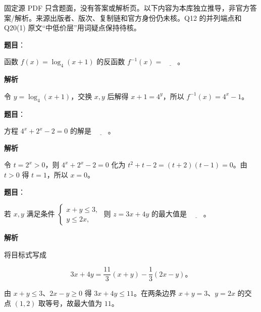 

\begin{gktip}
固定源 PDF 只含题面，没有答案或解析页。以下内容为本库独立推导，非官方答案/解析。来源出版者、版次、复制链和官方身份仍未核。Q12 的并列端点和 Q20(1) 原文“中低价层”用词疑点保持待核。
\end{gktip}

\begin{answer}

\textbf{题目}：

函数 $f(x)=\log_4(x+1)$ 的反函数 $f^{-1}(x)=\underline{\qquad}$。

\textbf{解析}

令 $y=\log_4(x+1)$，交换 $x,y$ 后解得 $x+1=4^y$，所以 $f^{-1}(x)=4^x-1$。


\end{answer}
\begin{answer}

\textbf{题目}：

方程 $4^x+2^x-2=0$ 的解是 $\underline{\qquad}$。

\textbf{解析}

令 $t=2^x>0$，则 $4^x+2^x-2=0$ 化为 $t^2+t-2=(t+2)(t-1)=0$。由 $t>0$ 得 $t=1$，所以 $x=0$。


\end{answer}
\begin{answer}

\textbf{题目}：

若 $x,y$ 满足条件 $\begin{cases}x+y\le 3,\\y\le 2x,\end{cases}$ 则 $z=3x+4y$ 的最大值是 $\underline{\qquad}$。

\textbf{解析}

将目标式写成

\nopagebreak[4]
\[
3x+4y=\frac{11}{3}(x+y)-\frac13(2x-y)\mbox{。}
\]

由 $x+y\le3$、$2x-y\ge0$ 得 $3x+4y\le11$。在两条边界 $x+y=3$、$y=2x$ 的交点 $(1,2)$ 取等号，故最大值为 $11$。


\end{answer}
